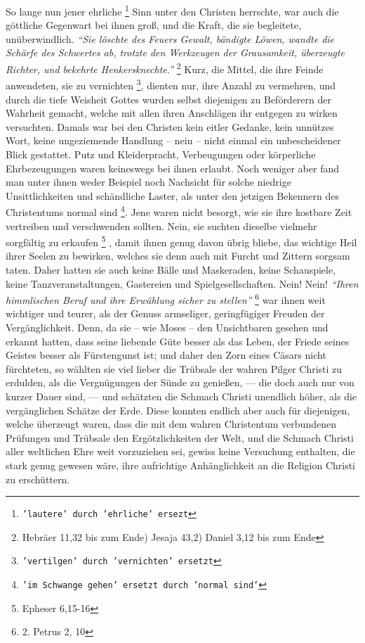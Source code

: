 \medskip

So lange nun jener ehrliche
\footnote{\texttt{'lautere' durch 'ehrliche' ersezt}}
Sinn unter den Christen herrschte, war auch die
göttliche Gegenwart bei ihnen groß, und die Kraft, die sie begleitete,
unüberwindlich.
\textit{"`Sie löschte des Feuers Gewalt, bändigte Löwen,
wandte die Schärfe des Schwertes ab, trotzte den Werkzeugen der Grausamkeit,
überzeugte Richter, und bekehrte Henkersknechte."'}
\footnote{Hebräer 11,32 bis zum Ende) Jesaja 43,2) Daniel 3,12 bis zum Ende}
 
Kurz, die Mittel, die ihre Feinde anwendeten, sie
zu vernichten
\footnote{\texttt{'vertilgen' durch 'vernichten' ersetzt}}, dienten
nur, ihre Anzahl zu vermehren, und durch die tiefe
Weisheit Gottes wurden selbst diejenigen zu Beförderern der Wahrheit gemacht,
welche mit allen ihren Anschlägen ihr entgegen zu wirken versuchten. Damals war
bei den Christen kein eitler Gedanke, kein unnützes Wort, keine ungeziemende
Handlung -- nein -- nicht einmal ein unbescheidener Blick gestattet. Putz und
Kleiderpracht, Verbeugungen oder körperliche Ehrbezeugungen waren keineswegs
bei ihnen erlaubt. Noch weniger aber fand man unter ihnen weder Beispiel noch
Nachsicht für solche niedrige Unsittlichkeiten und schändliche Laster, als unter
den jetzigen Bekennern des Christentums normal sind
\footnote{\texttt{'im Schwange gehen' ersetzt durch 'normal sind'}}.
Jene waren nicht
besorgt, wie sie ihre kostbare Zeit vertreiben und verschwenden sollten. Nein,
sie suchten dieselbe vielmehr sorgfältig zu erkaufen
\footnote{Epheser 6,15-16}
,
damit ihnen genug davon übrig bliebe, das wichtige Heil ihrer Seelen zu
bewirken, welches sie denn auch mit Furcht und Zittern sorgsam taten. Daher
hatten sie auch keine Bälle und Maskeraden, keine Schauspiele, keine
Tanzveranstaltungen, Gastereien und Spielgesellschaften. Nein! Nein!
\textit{"`Ihren himmlischen Beruf und ihre Erwählung sicher zu stellen"'}
\footnote{2. Petrus 2, 10}
war ihnen weit wichtiger und teurer, als der Genuss armseliger, geringfügiger
Freuden der Vergänglichkeit. Denn, da sie -- wie Moses -- den Unsichtbaren
gesehen und erkannt hatten, dass seine liebende Güte besser als das Leben,
der Friede seines Geistes besser als Fürstengunst ist; und daher den Zorn eines
Cäsars  nicht fürchteten, so wählten sie viel lieber die Trübsale
der wahren Pilger  Christi zu erdulden, als die Vergnügungen der
Sünde zu genießen, — die doch auch nur von kurzer Dauer sind, — und schätzten
die Schmach Christi unendlich höher, als die vergänglichen Schätze der Erde.
Diese konnten endlich aber auch für diejenigen, welche überzeugt waren, dass
die mit dem wahren Christentum verbundenen Prüfungen und Trübsale den
Ergötzlichkeiten der Welt, und die Schmach Christi aller weltlichen Ehre weit
vorzuziehen sei, gewiss keine Versuchung enthalten, die stark genug gewesen wäre,
ihre aufrichtige Anhänglichkeit an die Religion Christi zu erschüttern.

